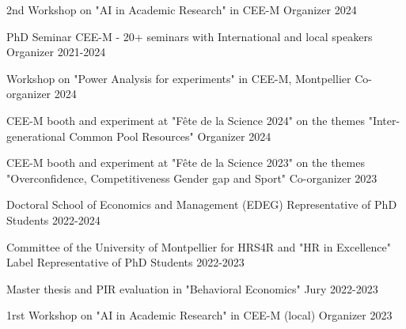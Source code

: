 \begin{cvhonors}

  \cvhonor
    {2nd Workshop on "AI in Academic Research" in CEE-M} %
    {Organizer} %
    {} %
    {2024} %

  \cvhonor
    {PhD Seminar CEE-M - 20+ seminars with International and local speakers} %
    {Organizer} %
    {} %
    {2021-2024} %

  \cvhonor
    {Workshop on "Power Analysis for experiments" in CEE-M, Montpellier} %
    {Co-organizer} %
    {} %
    {2024} %

  \cvhonor
    {CEE-M booth and experiment at "Fête de la Science 2024" on the themes "Inter-generational Common Pool Resources"} %
    {Organizer} %
    {} %
    {2024} %

  \cvhonor
    {CEE-M booth and experiment at "Fête de la Science 2023" on the themes "Overconfidence, Competitiveness Gender gap and Sport"} %
    {Co-organizer} %
    {} %
    {2023} %
    
  \cvhonor
    {Doctoral School of Economics and Management (EDEG)} %
    {Representative of PhD Students} %
    {} %
    {2022-2024} %

  \cvhonor
    {Committee of the University of Montpellier for HRS4R and "HR in Excellence" Label} %
    {Representative of PhD Students} %
    {} %
    {2022-2023} %

  \cvhonor
    {Master thesis and PIR evaluation in "Behavioral Economics"} %
    {Jury} %
    {} %
    {2022-2023} %

  \cvhonor
    {1rst Workshop on "AI in Academic Research" in CEE-M (local)} %
    {Organizer} %
    {} %
    {2023} %
    
\end{cvhonors}

